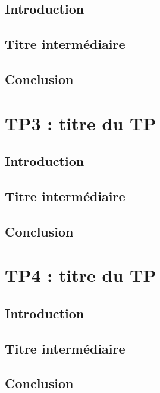 \documentclass{article}
\begin{document}
\subsection{Introduction}
\subsection{Titre intermédiaire}
\subsection{Conclusion}

\newpage
\section{TP3 : titre du TP}
\subsection{Introduction}
\subsection{Titre intermédiaire}
\subsection{Conclusion}

\newpage
\section{TP4 : titre du TP}
\subsection{Introduction}
\subsection{Titre intermédiaire}
\subsection{Conclusion}
\end{document}
